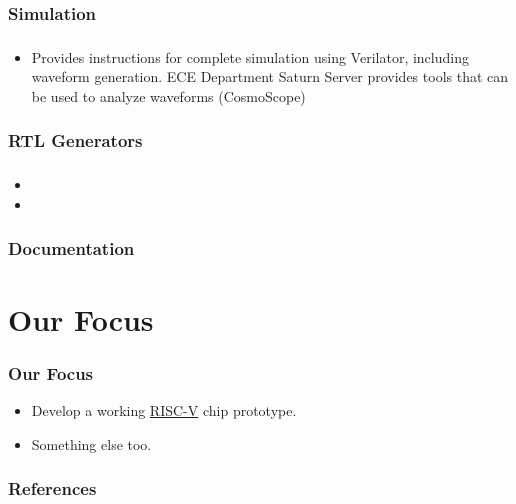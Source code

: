 \documentclass{weeklyslides}
\begin{document}
\subsubsection{Simulation}
\begin{frame}
  \frametitle{}
  \begin{itemize}
  \item Provides instructions for complete simulation using Verilator, including waveform generation. ECE Department Saturn Server provides tools that can be used to analyze waveforms (CosmoScope)
  \end{itemize}
\end{frame}


\subsubsection{RTL Generators}\label{subsubsec:RTL Generators}
\begin{frame}
  \frametitle{}
  \begin{itemize}
  \item
  \item
  \end{itemize}
\end{frame}


\subsubsection{Documentation}\label{subsubsec:Doc}
\begin{frame}
  \frametitle{}
\end{frame}


\section{Our Focus}\label{sec:Our_Focus}
\begin{frame}
  \frametitle{Our Focus}
  \begin{itemize}
  \item Develop a working \href{https://riscv.org/}{RISC-V} chip prototype.
  \item Something else too.
  \end{itemize}

\end{frame}

\begin{frame}
  \frametitle{References}
  \printbibliography{}
\end{frame}
\end{document}
